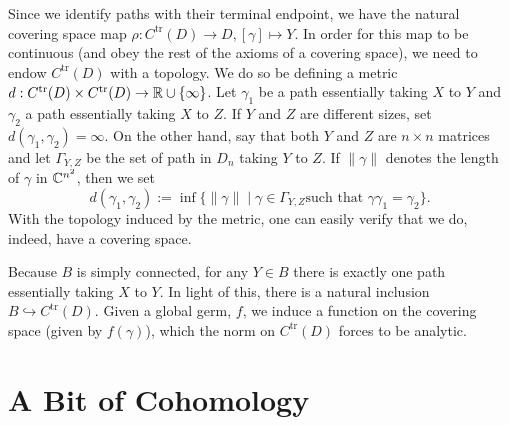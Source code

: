 Since we identify paths with their terminal endpoint, we have the natural
covering space map \(\rho: C^{\textrm{tr}}(D) \to D, [\gamma]\mapsto Y\). In order
for this map to be continuous (and obey the rest of the axioms of a covering
space), we need to endow \(C^{\textrm{tr}}(D)\) with a topology. We do so be
defining a metric
\(d: C^{\textrm{tr}}(D) \times  C^{\textrm{tr}}(D) \to \mathbb{R} \cup \{\infty\} \).
Let \(\gamma_1\) be a path essentially taking \(X\) to \(Y\) and \(\gamma_2\) a
path essentially taking \(X\) to \(Z\). If \(Y\) and \(Z\) are different sizes,
set \(d(\gamma_1,\gamma_2)=\infty\). On the other hand, say that both \(Y\) and
\(Z\) are \(n \times n \) matrices and let \(\Gamma_{Y,Z}\) be the set of path
in \(D_n\) taking \(Y\) to \(Z\). If \(\| \gamma \| \) denotes the length of
\(\gamma\) in \(\mathbb{C} ^{n^2}\), then we set
\[
  d(\gamma_1,\gamma_2) := \inf \{\| \gamma \| \mid \gamma \in \Gamma_{Y,Z} \textrm{
  such that } \gamma\gamma_1=\gamma_2\}.
\]
With the topology induced by the metric, one can
easily verify that we do, indeed, have a covering space.

Because \(B\) is simply connected, for any \(Y \in B\) there is exactly one path
essentially taking \(X\) to \(Y\). In light of this, there is a natural
inclusion \(B \hookrightarrow C^{\textrm{tr}}(D)\). Given a global germ, \(f\),
we induce a function on the covering space (given by \(f(\gamma)\)), which the
norm on \(C^{\textrm{tr}}(D)\) forces to be analytic.

\section{A Bit of Cohomology}%
\label{sec:cohomo}

